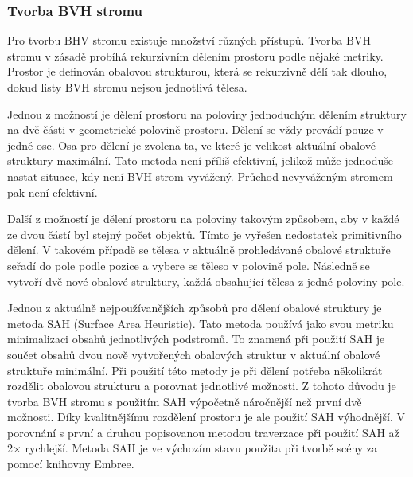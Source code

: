 \documentclass[czech,master]{diploma}
\begin{document}
\subsubsection{Tvorba BVH stromu}
Pro tvorbu BHV stromu existuje množství různých přístupů. Tvorba BVH stromu v zásadě probíhá rekurzivním dělením prostoru podle nějaké metriky. Prostor je definován obalovou strukturou, která se rekurzivně dělí tak dlouho, dokud listy BVH stromu nejsou jednotlivá tělesa. \par
Jednou z možností je dělení prostoru na poloviny jednoduchým dělením struktury na dvě části v geometrické polovině prostoru. Dělení se vždy provádí pouze v jedné ose. Osa pro dělení je zvolena ta, ve které je velikost aktuální obalové struktury maximální. Tato metoda není příliš efektivní, jelikož může jednoduše nastat situace, kdy není BVH strom vyvážený. Průchod nevyváženým stromem pak není efektivní. \par
Další z možností je dělení prostoru na poloviny takovým způsobem, aby v každé ze dvou částí byl stejný počet objektů. Tímto je vyřešen nedostatek primitivního dělení. V takovém případě se tělesa v aktuálně prohledávané obalové struktuře seřadí do pole podle pozice a vybere se těleso v polovině pole. Následně se vytvoří dvě nové obalové struktury, každá obsahující tělesa z jedné poloviny pole.\par
Jednou z aktuálně nejpoužívanějších způsobů pro dělení obalové struktury je metoda SAH (Surface Area Heuristic). Tato metoda používá jako svou metriku minimalizaci obsahů jednotlivých podstromů. To znamená při použití SAH je součet obsahů dvou nově vytvořených obalových struktur v aktuální obalové struktuře minimální. Při použití této metody je při dělení potřeba několikrát rozdělit obalovou strukturu a porovnat jednotlivé možnosti. Z tohoto důvodu je tvorba BVH stromu s použitím SAH výpočetně náročnější než první dvě možnosti. Díky kvalitnějšímu rozdělení prostoru je ale použití SAH výhodnější. V porovnání s první a druhou popisovanou metodou traverzace při použití SAH až 2\(\times\) rychlejší\cite{SAH}. Metoda SAH je ve výchozím stavu použita při tvorbě scény za pomocí knihovny Embree.
\end{document}
